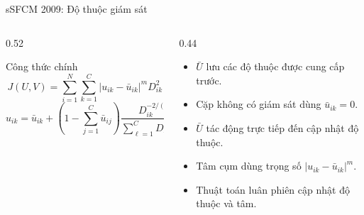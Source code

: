 \documentclass[t,aspectratio=169]{beamer}
\begin{document}
\begin{frame}{sSFCM 2009: Độ thuộc giám sát}
  \begin{columns}[T,onlytextwidth]
    \begin{column}{0.52\textwidth}
      \begin{block}{Công thức chính}
        \[
          J(U,V)=\sum_{i=1}^{N}\sum_{k=1}^{C}
          \left|u_{ik}-\bar{u}_{ik}\right|^{m}D_{ik}^{2}
        \]
        \[
          u_{ik}=\bar{u}_{ik}+
          \left(1-\sum_{j=1}^{C}\bar{u}_{ij}\right)
          \frac{D_{ik}^{-2/(m-1)}}
          {\sum_{\ell=1}^{C}D_{i\ell}^{-2/(m-1)}}
        \]
      \end{block}
    \end{column}
    \begin{column}{0.44\textwidth}
      \begin{itemize}
        \item $\bar U$ lưu các độ thuộc được cung cấp trước.
        \item Cặp không có giám sát dùng $\bar u_{ik}=0$.
        \item $\bar U$ tác động trực tiếp đến cập nhật độ thuộc.
        \item Tâm cụm dùng trọng số $|u_{ik}-\bar u_{ik}|^m$.
        \item Thuật toán luân phiên cập nhật độ thuộc và tâm.
      \end{itemize}
    \end{column}
  \end{columns}
\end{frame}
\end{document}

